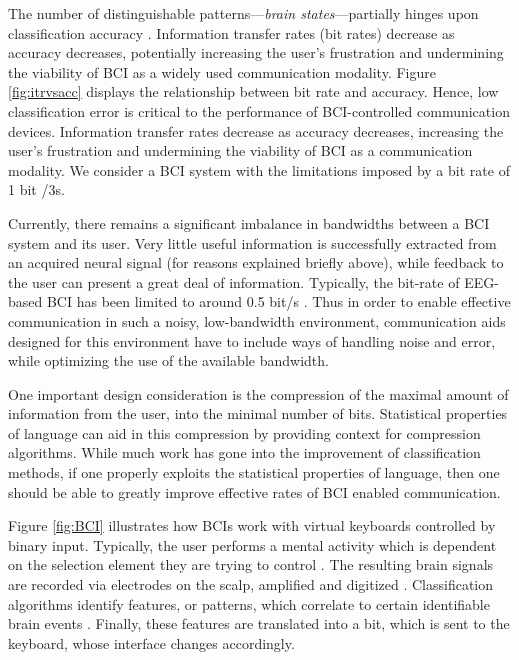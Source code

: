 \documentclass[12pt,titlepage]{article}
\begin{document}
The number of distinguishable patterns---\emph{brain states}---partially hinges upon classification 
accuracy \cite{lotte_review_2007}.  Information transfer rates (bit rates) decrease as accuracy decreases, potentially increasing the user's frustration and  undermining the viability of BCI as a widely used communication modality.  Figure \ref{fig:itrvsacc} displays the relationship between bit rate and accuracy.  Hence, low classification error is critical to the performance of BCI-controlled communication devices.  Information transfer rates decrease as accuracy decreases, increasing the user's frustration and  undermining the viability of BCI as a communication modality.   We consider a BCI system with the limitations imposed by a bit rate of 1 bit /3s.

Currently, there remains a significant imbalance in bandwidths between a BCI system and its 
user. Very little useful information is successfully extracted from an acquired neural signal (for 
reasons explained briefly above), while feedback to the user can present a great deal of 
information.  Typically, the bit-rate of EEG-based BCI has been limited to around 0.5 bit/s \cite{millan2004}.  Thus in order to enable effective communication in such a noisy, low-bandwidth 
environment, communication aids designed for this environment have to include ways of 
handling noise and error, while optimizing the use of the available bandwidth.

One important design consideration is the compression of the maximal amount of information 
from the user, into the minimal number of bits.  Statistical properties of language can aid in this 
compression by providing context for compression algorithms.  While much work has gone 
into the improvement of classification methods, if one properly exploits the statistical 
properties of language, then one should be able to greatly improve effective rates of BCI 
enabled communication. 

Figure \ref{fig:BCI} illustrates how BCIs work with virtual keyboards controlled by binary input.  Typically, the user performs a mental activity which is dependent on the selection element they are trying to control \cite{molina_direct}.  The resulting brain signals are recorded via electrodes on the scalp, amplified and digitized \cite{lotte_review_2007}.  Classification algorithms identify features, or patterns, which correlate to certain identifiable brain events \cite{lotte_review_2007}.  Finally, these features are translated into a bit, which is sent to the keyboard, whose interface changes accordingly.
\end{document}
